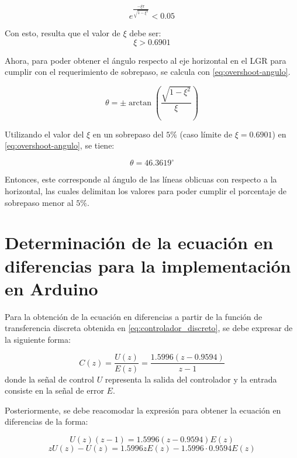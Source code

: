 \begin{equation} \label{overshoot_inec}
    e^{\frac{-\xi\pi}{\sqrt{1-\xi^2}}} < 0.05
\end{equation}

Con esto, resulta que el valor de $\xi$ debe ser:
\begin{equation} \label{eq:xi_inec}
    \xi>0.6901
\end{equation}

Ahora, para poder obtener el ángulo respecto al eje horizontal en el LGR para cumplir con el requerimiento de sobrepaso, se calcula con \eqref{eq:overshoot-angulo}.

\begin{equation} \label{eq:overshoot-angulo}
    \theta = \pm\arctan{\left(\frac{\sqrt{1-\xi^2}}{\xi}\right)}
\end{equation}

Utilizando el valor del $\xi$ en un sobrepaso del $5\%$ (caso límite de $\xi=0.6901$) en \eqref{eq:overshoot-angulo}, se tiene:

\begin{equation} \label{valor_angulo}
    \theta=46.3619^\circ
\end{equation}

Entonces, este corresponde al ángulo de las líneas oblicuas con respecto a la horizontal, las cuales delimitan los valores para poder cumplir el porcentaje de sobrepaso menor al $5\%$.

\section{Determinación de la ecuación en diferencias para la implementación en Arduino} \label{anexoC}

Para la obtención de la ecuación en diferencias a partir de la función de transferencia discreta obtenida en \eqref{eq:controlador_discreto}, se debe expresar de la siguiente forma:

\begin{equation}
    C(z) = \frac{U(z)}{E(z)} = \frac{1.5996 \left( z - 0.9594 \right)}{z-1}
\end{equation}
\noindent donde la señal de control $U$ representa la salida del controlador y la entrada consiste en la señal de error $E$.

Posteriormente, se debe reacomodar la expresión para obtener la ecuación en diferencias de la forma:

\begin{equation*}
    U(z) \left(z-1\right)= 1.5996 \left( z - 0.9594 \right) E(z)
\end{equation*}
\begin{equation}
    zU(z) - U(z) = 1.5996 z E(z) - 1.5996 \cdot 0.9594 E(z)
\end{equation}

